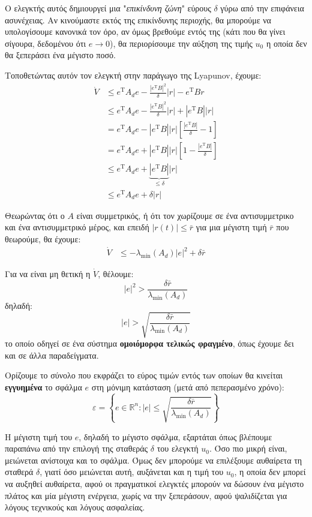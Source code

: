 \documentclass[11pt,a4paper,notitlepage,fleqn]{article}
\let\mytodo\todo
\renewcommand{\todo}[1]{\par\mytodo[inline,noline]{#1}}
\begin{document}
Ο ελεγκτής αυτός δημιουργεί μια "\textit{επικίνδυνη ζώνη}" εύρους \( δ \) γύρω
από την επιφάνεια ασυνέχειας. Αν κινούμαστε εκτός της επικίνδυνης περιοχής, θα μπορούμε να υπολογίσουμε κανονικά τον όρο, αν όμως βρεθούμε
εντός της (κάτι που θα γίνει σίγουρα, δεδομένου ότι \( e\to 0 \)),
θα περιορίσουμε την αύξηση της τιμής \( u_0 \) η οποία δεν θα ξεπεράσει
ένα μέγιστο ποσό.

\todo{Graph 41}

Τοποθετώντας αυτόν τον ελεγκτή στην παράγωγο της Lyapunov, έχουμε:
\begin{align*}
	\dot V &\leq e^{\mathrm T} A_d e - \frac{\left|e^{\mathrm T} B\right|^2}{\delta}|r| - e^{\mathrm T} B r
	\\ &\leq e^{\mathrm T} A_d e - \frac{\left| e^{\mathrm T} B \right|^2}{\delta} |r| + \left| e^{\mathrm T} B \right||r|
	\\ &= e^{\mathrm T} A_d e - \left| e^{\mathrm T}B \right||r|
	\left[
	\frac{\left| e^{\mathrm T}B \right|}{\delta} - 1
	\right]
	\\ &= e^{\mathrm T} A_d e + \left| e^{\mathrm T}B \right||r|\left[
	1 - \frac{\left| e^{\mathrm T} B \right|}{\delta}
	\right]
	\\ &\leq e^{\mathrm T} A_d e + \underbrace{\left| e^{\mathrm T} B \right|}_{\leq \delta}|r|
	\\ &\leq e^{\mathrm T} A_d e + \delta |r|
\end{align*}

Θεωρώντας ότι ο \( A \) είναι συμμετρικός, ή ότι τον χωρίζουμε σε ένα
αντισυμμετρικο και ένα αντισυμμετρικό μέρος, 
και επειδή \( |r(t)| \leq \bar r \) για μια μέγιστη τιμή \( \bar r \)
που θεωρούμε,
θα έχουμε:
\begin{align*}
	\dot V &\leq - \lambda_{\min}(A_d) |e|^2 + \delta \bar r
\end{align*}

Για να είναι μη θετική η \( \dot V \), θέλουμε:
\[
|e|^2 > \frac{\delta \bar r}{\lambda_{\min}(A_d)}
\]
δηλαδή:
\[
|e| > \sqrt{\frac{
	\delta \bar r}{\lambda_{\min} (A_d) }}
\]
το οποίο οδηγεί σε ένα σύστημα \textbf{ομοιόμορφα τελικώς φραγμένο}, όπως
έχουμε δει και σε άλλα παραδείγματα.

Ορίζουμε το σύνολο που εκφράζει το εύρος τιμών εντός των οποίων θα κινείται \textbf{εγγυημένα} το σφάλμα \( e \) στη μόνιμη κατάσταση (μετά από πεπερασμένο χρόνο):
\[
\varepsilon = \left\lbrace 
e \in \mathbb R^n :
|e| \leq \sqrt{
\frac{\delta \bar r}{\lambda_{\min} (A_d)}
}
 \right\rbrace
\]

Η μέγιστη τιμή του \( e \), δηλαδή το μέγιστο σφάλμα, εξαρτάται όπως βλέπουμε παραπάνω από την επιλογή της σταθεράς \( \delta \) του ελεγκτή \( u_0 \). Όσο πιο μικρή είναι, μειώνεται ανίστοιχα και το σφάλμα. Όμως δεν μπορούμε να επιλέξουμε αυθαίρετα τη σταθερά \( \delta \), γιατί όσο μειώνεται αυτή, αυξάνεται και η τιμή του \( u_0 \), η οποία δεν μπορεί να αυξηθεί αυθαίρετα, αφού οι πραγματικοί ελεγκτές μπορούν να δώσουν ένα μέγιστο πλάτος και μία μέγιστη ενέργεια, χωρίς να την ξεπεράσουν, αφού ψαλιδίζεται για λόγους τεχνικούς και λόγους ασφαλείας.
\end{document}
